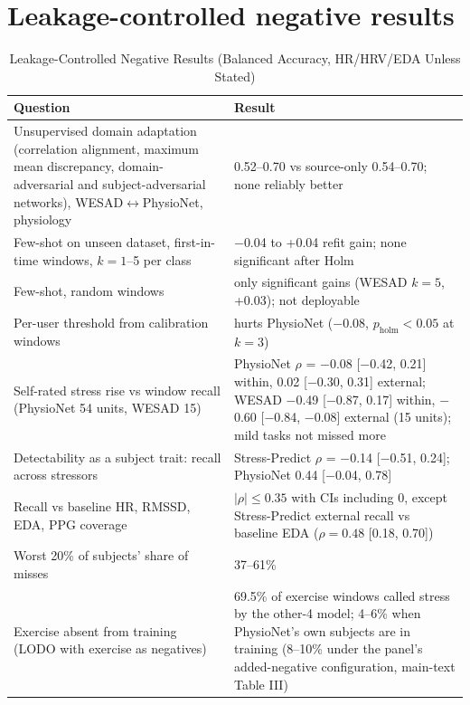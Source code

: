 \documentclass[journal]{IEEEtran}
\newcommand{\m}{$-$}
\begin{document}
\section{Leakage-controlled negative results}
\begin{table}[!t]
\centering
\caption{Leakage-Controlled Negative Results (Balanced Accuracy, HR/HRV/EDA Unless Stated)}
\label{tab:neg}
\footnotesize
\begin{tabularx}{\columnwidth}{@{}LL@{}}
\toprule
Question & Result \\
\midrule
Unsupervised domain adaptation (correlation alignment, maximum mean discrepancy, domain-adversarial and subject-adversarial networks), WESAD$\leftrightarrow$PhysioNet, physiology & 0.52--0.70 vs source-only 0.54--0.70; none reliably better \\
Few-shot on unseen dataset, first-in-time windows, $k=1$--5 per class & \m0.04 to +0.04 refit gain; none significant after Holm \\
Few-shot, random windows & only significant gains (WESAD $k=5$, +0.03); not deployable \\
Per-user threshold from calibration windows & hurts PhysioNet (\m0.08, $p_{\mathrm{holm}}<0.05$ at $k=3$) \\
Self-rated stress rise vs window recall (PhysioNet 54 units, WESAD 15) & PhysioNet $\rho$ = \m0.08 [\m0.42, 0.21] within, 0.02 [\m0.30, 0.31] external; WESAD \m0.49 [\m0.87, 0.17] within, \m0.60 [\m0.84, \m0.08] external (15 units); mild tasks not missed more \\
Detectability as a subject trait: recall across stressors & Stress-Predict $\rho$ = \m0.14 [\m0.51, 0.24]; PhysioNet 0.44 [\m0.04, 0.78] \\
Recall vs baseline HR, RMSSD, EDA, PPG coverage & $|\rho|\le 0.35$ with CIs including 0, except Stress-Predict external recall vs baseline EDA ($\rho=0.48$ [0.18, 0.70]) \\
Worst 20\% of subjects' share of misses & 37--61\% \\
Exercise absent from training (LODO with exercise as negatives) & 69.5\% of exercise windows called stress by the other-4 model; 4--6\% when PhysioNet's own subjects are in training (8--10\% under the panel's added-negative configuration, main-text Table III) \\
\bottomrule
\end{tabularx}
\end{table}
\end{document}
